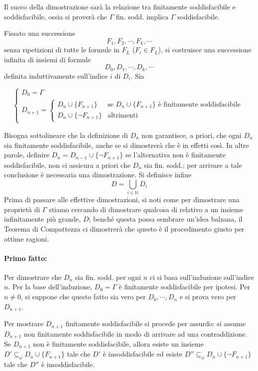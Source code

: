 Il succo della dimostrazione sarà la relazione tra 
finitamente soddisfacibile e soddisfacibile, ossia 
si proverà che $\Gamma$ fin. sodd. implica $\Gamma$ soddisfacibile. 

Fissato una successione 
$$
F_1, F_2, \cdots, F_k, \cdots
$$ 
senza ripetizioni di tutte le formule in $F_L$ ($F_i \in F_L$), si costruisce una successione 
infinita di insiemi di formule 
$$
D_0, D_1, \cdots, D_k, \cdots
$$ 
definita induttivamente sull'indice $i$ di $D_i$. Sia 

$$
\begin{cases}
        D_0 = \Gamma \\
        D_{n+1} = 
        \begin{cases} 
          D_n \cup \{F_{n+1}\} & \text{se } D_n \cup \{F_{n+1}\} \text{ è finitamente soddisfacibile} \\
          D_n \cup \{\neg F_{n+1}\} & \text{altrimenti}
        \end{cases}
\end{cases}
$$

Bisogna sottolineare che la definizione di $D_n$ non garantisce, a priori, 
che ogni $D_n$ sia finitamente soddisfacibile, anche se si dimostrerà che è 
in effetti così. In altre parole, definire $D_n = D_{n-1} \cup \{\neg F_{n+1}\}$ 
se l'alternativa non è finitamente soddisfacibile, non ci assicura a priori che 
$D_n$ sia fin. sodd.; per arrivare a tale conclusione è necessaria una 
dimostrazione.
Si definisce infine
$$
D = \bigcup_{i \in \mathbb{N}} D_i
$$
Prima di passare alle effettive dimostrazioni, si noti come per dimostrare 
una proprietà di $\Gamma$ stiamo cercando di dimostrare qualcosa di relativo a 
un insieme infinitamente più grande, $D$; benché questa possa sembrare un'idea 
balzana, il Teorema di Compattezza ci dimostrerà che questo è il procedimento 
giusto per ottime ragioni. 

\paragraph{Primo fatto:}
Per dimostrare che $D_n$ sia fin. sodd. per ogni $n$ ci si basa sull'induzione 
sull'indice $n$. 
Per la base dell'induzione, 
$D_0 = \Gamma$ è finitamente soddisfacibile per ipotesi. Per $n \neq 0$, si suppone 
che questo fatto sia vero per $D_0, \cdots, D_n$ e si prova vero per $D_{n+1}$. 

Per mostrare $D_{n+1}$ finitamente soddisfacibile si procede per assurdo: si assume 
$D_{n+1}$ non finitamente soddisfacibile in modo di arrivare ad una contraddizione. 
Se $D_{n+1}$ non è finitamente soddisfacibile,
allora esiste un insieme $D' \subseteq_{\omega} D_{n}\cup \{F_{n+1}\}$ 
tale che $D'$ è insoddisfacibile ed esiste $D''\subseteq_{\omega} D_{n} \cup \{\neg F_{n+1}\}$
tale che $D''$ è insoddisfacibile. 

